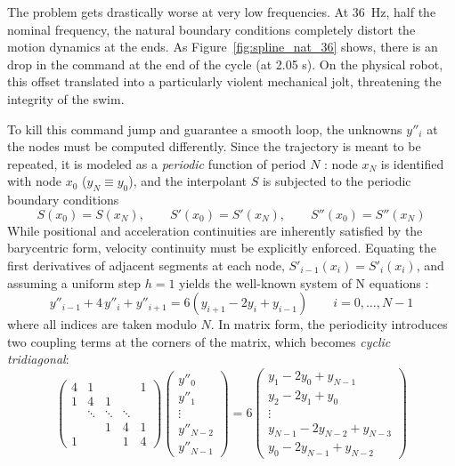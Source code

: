 \documentclass{tropLaClasse}
\begin{document}
The problem gets drastically worse at very low frequencies. At 36~Hz, half the nominal frequency, the natural boundary conditions completely distort the motion dynamics at the ends. As Figure~\ref{fig:spline_nat_36} shows, there is an drop in the command at the end of the cycle (at 2.05 s). On the physical robot, this offset translated into a particularly violent mechanical jolt, threatening the integrity of the swim.

To kill this command jump and guarantee a smooth loop, the unknowns $y''_i$ at the nodes must be computed differently. Since the trajectory is meant to be repeated, it is modeled as a \emph{periodic} function of period $N$ : node $x_N$ is identified with node $x_0$ ($y_N \equiv y_0$), and the interpolant $S$ is subjected to the periodic boundary conditions
\begin{equation}
    S(x_0) = S(x_N), \qquad S'(x_0) = S'(x_N), \qquad S''(x_0) = S''(x_N)
    \label{eq:periodiques}
\end{equation}
While positional and acceleration continuities are inherently satisfied by the barycentric form, velocity continuity must be explicitly enforced. Equating the first derivatives of adjacent segments at each node, $S'_{i-1}(x_i) = S'_i(x_i)$, and assuming a uniform step $h=1$ yields the well-known system of N equations :
\begin{equation}
    y''_{i-1} + 4\,y''_i + y''_{i+1} = 6\left(y_{i+1} - 2y_i + y_{i-1}\right)
    \qquad i = 0,\dots,N-1
    \label{eq:systeme-cyclique}
\end{equation}
where all indices are taken modulo $N$. In matrix form, the periodicity introduces two coupling terms at the corners of the matrix, which becomes \emph{cyclic tridiagonal}:
\begin{equation}
    \begin{pmatrix}
        4 & 1 &        &        & 1 \\
        1 & 4 & 1      &        &   \\
          & \ddots & \ddots & \ddots &   \\
          &        & 1      & 4      & 1 \\
        1 &        &        & 1      & 4
    \end{pmatrix}
    \begin{pmatrix} y''_0 \\ y''_1 \\ \vdots \\ y''_{N-2} \\ y''_{N-1} \end{pmatrix}
    =
    6\begin{pmatrix}
        y_1 - 2y_0 + y_{N-1} \\
        y_2 - 2y_1 + y_0 \\
        \vdots \\
        y_{N-1} - 2y_{N-2} + y_{N-3} \\
        y_0 - 2y_{N-1} + y_{N-2}
    \end{pmatrix}
    \label{eq:matrice-cyclique}
\end{equation}
\end{document}

